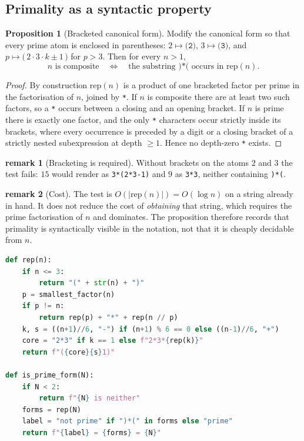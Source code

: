 \documentclass[11pt]{article}
\theoremstyle{definition}
\newtheorem{proposition}{Proposition}
\newtheorem{remark}{remark}
\begin{document}
\subsection{Primality as a syntactic property}

\begin{proposition}[Bracketed canonical form]
Modify the canonical form so that every prime atom is enclosed in
parentheses: $2 \mapsto \texttt{(2)}$, $3 \mapsto \texttt{(3)}$, and
$p \mapsto \texttt{(}\,2\!\cdot\!3\!\cdot\! k \pm 1\,\texttt{)}$ for $p>3$.
Then for every $n>1$,
\[
  n \text{ is composite}
  \quad\Longleftrightarrow\quad
  \text{the substring } \texttt{)*(} \text{ occurs in } \mathrm{rep}(n).
\]
\end{proposition}

\begin{proof}
By construction $\mathrm{rep}(n)$ is a product of one bracketed factor per
prime in the factorisation of $n$, joined by \texttt{*}. If $n$ is composite
there are at least two such factors, so a \texttt{*} occurs between a closing
and an opening bracket. If $n$ is prime there is exactly one factor, and the
only \texttt{*} characters occur strictly inside its brackets, where every
occurrence is preceded by a digit or a closing bracket of a strictly nested
subexpression at depth $\ge 1$. Hence no depth-zero \texttt{*} exists.
\end{proof}

\begin{remark}[Bracketing is required]
Without brackets on the atoms $2$ and $3$ the test fails: $15$ would render as
\texttt{3*(2*3-1)} and $9$ as \texttt{3*3}, neither containing \texttt{)*(}.
\end{remark}

\begin{remark}[Cost]
The test is $O(|\mathrm{rep}(n)|) = O(\log n)$ on a string already in hand.
It does not reduce the cost of \emph{obtaining} that string, which requires
the prime factorisation of $n$ and dominates. The proposition therefore
records that primality is syntactically visible in the notation, not that it
is cheaply decidable from $n$.
\end{remark}

\begin{lstlisting}[language=Python]
def rep(n):
    if n <= 3:
        return "(" + str(n) + ")"
    p = smallest_factor(n)
    if p != n:
        return rep(p) + "*" + rep(n // p)
    k, s = ((n+1)//6, "-") if (n+1) % 6 == 0 else ((n-1)//6, "+")
    core = "2*3" if k == 1 else f"2*3*{rep(k)}"
    return f"({core}{s}1)"

def is_prime_form(N):
    if N < 2:
        return f"{N} is neither"
    forms = rep(N)
    label = "not prime" if ")*(" in forms else "prime"
    return f"{label} = {forms} = {N}"
\end{lstlisting}
\end{document}
